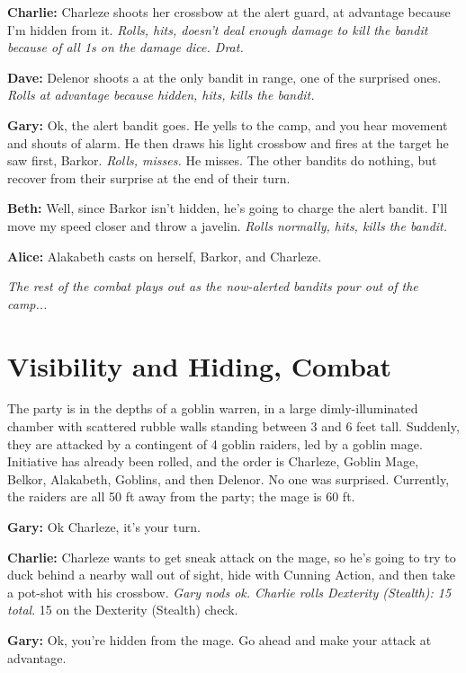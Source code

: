 \textbf{Charlie:} Charleze shoots her crossbow at the alert guard, at advantage because I'm hidden from it. \textit{Rolls, hits, doesn't deal enough damage to kill the bandit because of all 1s on the damage dice. Drat.}

\textbf{Dave:} Delenor shoots a  at the only bandit in range, one of the surprised ones. \textit{Rolls at advantage because hidden, hits, kills the bandit.}

\textbf{Gary:} Ok, the alert bandit goes. He yells to the camp, and you hear movement and shouts of alarm. He then draws his light crossbow and fires at the target he saw first, Barkor. \textit{Rolls, misses.} He misses. The other bandits do nothing, but recover from their surprise at the end of their turn.

\textbf{Beth:} Well, since Barkor isn't hidden, he's going to charge the alert bandit. I'll move my speed closer and throw a javelin. \textit{Rolls normally, hits, kills the bandit.}

\textbf{Alice:} Alakabeth casts  on herself, Barkor, and Charleze.

\textit{The rest of the combat plays out as the now-alerted bandits pour out of the camp...}

\section{Visibility and Hiding, Combat}\label{example:visibility-and-hiding}
The party is in the depths of a goblin warren, in a large dimly-illuminated chamber with scattered rubble walls standing between 3 and 6 feet tall. Suddenly, they are attacked by a contingent of 4 goblin raiders, led by a goblin mage. Initiative has already been rolled, and the order is Charleze, Goblin Mage, Belkor, Alakabeth, Goblins, and then Delenor. No one was surprised. Currently, the raiders are all 50 ft away from the party; the mage is 60 ft.

\textbf{Gary:} Ok Charleze, it's your turn.

\textbf{Charlie:} Charleze wants to get sneak attack on the mage, so he's going to try to duck behind a nearby wall out of sight, hide with Cunning Action, and then take a pot-shot with his crossbow. \textit{Gary nods ok. Charlie rolls Dexterity (Stealth): 15 total}. 15 on the Dexterity (Stealth) check.

\textbf{Gary:} Ok, you're hidden from the mage. Go ahead and make your attack at advantage.

